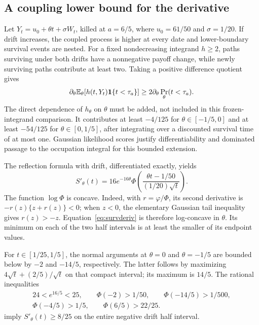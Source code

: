 \subsection{A coupling lower bound for the derivative}
Let $Y_t=u_0+\theta t+\sigma W_t$, killed at $a=6/5$, where $u_0=61/50$ and $\sigma=1/20$. If drift increases, the coupled process is higher at every date and lower-boundary survival events are nested. For a fixed nondecreasing integrand $h\ge2$, paths surviving under both drifts have a nonnegative payoff change, while newly surviving paths contribute at least two. Taking a positive difference quotient gives
\begin{equation}
 \partial_\theta\mathbb E_\theta[h(t,Y_t)\mathbf 1\{t<\tau_a\}]
 \ge2\partial_\theta\Pr_\theta(t<\tau_a).
\end{equation}
The direct dependence of $h_\theta$ on $\theta$ must be added, not included in this frozen-integrand comparison. It contributes at least $-4/125$ for $\theta\in[-1/5,0]$ and at least $-54/125$ for $\theta\in[0,1/5]$, after integrating over a discounted survival time of at most one. Gaussian likelihood scores justify differentiability and dominated passage to the occupation integral for this bounded extension.

The reflection formula with drift, differentiated exactly, yields
\begin{equation}\label{eq:survderiv}
 S'_\theta(t)=16e^{-16\theta}\Phi\left(\frac{\theta t-1/50}{(1/20)\sqrt t}\right).
\end{equation}
The function $\log\Phi$ is concave. Indeed, with $r=\varphi/\Phi$, its second derivative is $-r(z)\{z+r(z)\}<0$; when $z<0$, the elementary Gaussian tail inequality gives $r(z)>-z$. Equation~\eqref{eq:survderiv} is therefore log-concave in $\theta$. Its minimum on each of the two half intervals is at least the smaller of its endpoint values.

For $t\in[1/25,1/5]$, the normal arguments at $\theta=0$ and $\theta=-1/5$ are bounded below by $-2$ and $-14/5$, respectively. The latter follows by maximizing $4\sqrt t+(2/5)/\sqrt t$ on that compact interval; its maximum is $14/5$. The rational inequalities
\begin{gather}\label{eq:normalbounds}
 24<e^{16/5}<25,\qquad \Phi(-2)>1/50,\qquad \Phi(-14/5)>1/500,\\
 \Phi(-4/5)>1/5,\qquad \Phi(6/5)>22/25.\nonumber
\end{gather}
imply $S'_\theta(t)\ge8/25$ on the entire negative drift half interval.

